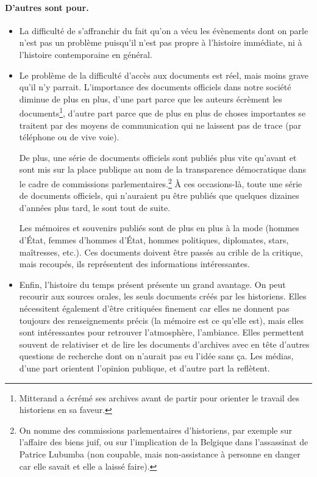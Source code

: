 \documentclass[12pt]{report}
\begin{document}
\paragraph{D'autres sont pour.}
\begin{itemize}
	\item La difficulté de s'affranchir du fait qu'on a vécu les évènements dont on parle n'est pas un problème puisqu'il n'est pas propre à l'histoire immédiate, ni à l'histoire contemporaine en général.
	\item Le problème de la difficulté d'accès aux documents est réel, mais moins grave qu'il n'y parrait. L'importance des documents officiels dans notre société diminue de plus en plus, d'une part parce que les auteurs écrèment les documents\footnote{Mitterand a écrémé ses archives avant de partir pour orienter le travail des historiens en sa faveur.}, d'autre part parce que de plus en plus de choses importantes se traitent par des moyens de communication qui ne laissent pas de trace (par téléphone ou de vive voie). 
		
		De plus, une série de documents officiels sont publiés plus vite qu'avant et sont mis sur la place publique au nom de la transparence démocratique dans le cadre de commissions parlementaires.\footnote{On nomme des commissions parlementaires d'historiens, par exemple sur l'affaire des biens juif, ou sur l'implication de la Belgique dans l'assassinat de Patrice Lubumba (non coupable, mais non-assistance à personne en danger car elle savait et elle a laissé faire).} À ces occasions-là, toute une série de documents officiels, qui n'auraient pu être publiés que quelques dizaines d'années plus tard, le sont tout de suite.

		Les mémoires et souvenirs publiés sont de plus en plus à la mode (hommes d'État, femmes d'hommes d'État, hommes politiques, diplomates, stars, maîtresses, etc.). Ces documents doivent être passés au crible de la critique, mais recoupés, ils représentent des informations intéressantes.

	\item Enfin, l'histoire du temps présent présente un grand avantage. On peut recourir aux sources orales, les seuls documents créés par les historiens. Elles nécessitent également d'être critiquées finement car elles ne donnent pas toujours des renseignements précis (la mémoire est ce qu'elle est), mais elles sont intéressantes pour retrouver l'atmosphère, l'ambiance. Elles permettent souvent de relativiser et de lire les documents d'archives avec en tête d'autres questions de recherche dont on n'aurait pas eu l'idée sans ça. Les médias, d'une part orientent l'opinion publique, et d'autre part la reflètent.
\end{itemize}
\end{document}
